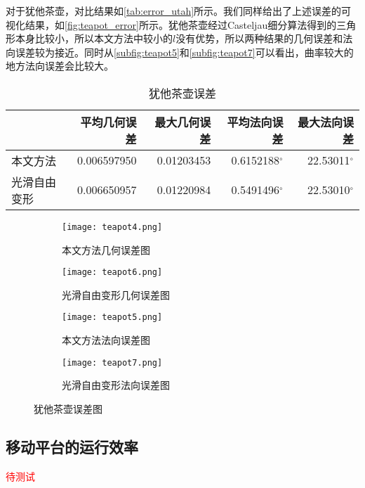 对于犹他茶壶，对比结果如\autoref{tab:error_utah}所示。我们同样给出了上述误差的可视化结果，如\autoref{fig:teapot_error}所示。犹他茶壶经过Casteljau细分算法得到的三角形本身比较小，所以本文方法中较小的$l$没有优势，所以两种结果的几何误差和法向误差较为接近。同时从\autoref{subfig:teapot5}和\autoref{subfig:teapot7}可以看出，曲率较大的地方法向误差会比较大。

\begin{table}[htbp]
    \centering
    \begin{tabular}{lrrrr}
    \toprule
        & 平均几何误差 & 最大几何误差 & 平均法向误差 & 最大法向误差 \\
    \midrule
        本文方法    & \num{0.006597950} & \num{0.01203453} & \num[scientific-notation=false]{0.6152188}$^\circ$ & \num[scientific-notation=false]{22.53011}$^\circ$ \\
        光滑自由变形& \num{0.006650957} & \num{0.01220984} & \num[scientific-notation=false]{0.5491496}$^\circ$ & \num[scientific-notation=false]{22.53010}$^\circ$ \\
    \bottomrule
    \end{tabular}
    \caption{犹他茶壶误差} \label{tab:error_utah}
\end{table}

\begin{figure}[htbp]
	\centering
	\begin{subfigure}[b]{.4\textwidth}
		\centering
		\texttt{[image: teapot4.png]}
		\caption{本文方法几何误差图}\label{subfig:teapot4}
	\end{subfigure}
	\begin{subfigure}[b]{.4\textwidth}
		\centering
		\texttt{[image: teapot6.png]}
		\caption{光滑自由变形几何误差图}\label{subfig:teapot6}
	\end{subfigure}
	\begin{subfigure}[b]{.4\textwidth}
		\centering
		\texttt{[image: teapot5.png]}
		\caption{本文方法法向误差图}\label{subfig:teapot5}
	\end{subfigure}
	\begin{subfigure}[b]{.4\textwidth}
		\centering
		\texttt{[image: teapot7.png]}
		\caption{光滑自由变形法向误差图}\label{subfig:teapot7}
	\end{subfigure}
	\caption{犹他茶壶误差图}\label{fig:teapot_error}
\end{figure}

\subsection{移动平台的运行效率}
\textcolor{red}{待测试}
